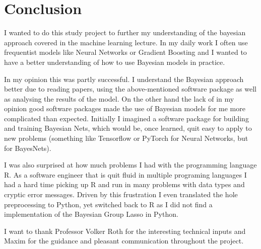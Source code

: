 \documentclass[twoside,twocolumn]{article}
\begin{document}
\section{Conclusion} \label{sec:conclusion}

I wanted to do this study project to further my understanding of the bayesian approach covered in the machine learning lecture.
In my daily work I often use frequentist models like Neural Networks or Gradient Boosting and I wanted to have a better understanding of how to use Bayesian models in practice.

In my opinion this was partly successful.
I understand the Bayesian approach better due to reading papers, using the above-mentioned software package as well as analysing the results of the model.
On the other hand the lack of in my opinion good software packages made the use of Bayesian models for me more complicated than expected.
Initially I imagined a software package for building and training Bayesian Nets, which would be, once learned, quit easy to apply to new problems (something like Tensorflow or PyTorch for Neural Networks, but for BayesNets).

I was also surprised at how much problems I had with the programming language R.
As a software engineer that is quit fluid in multiple programing languages I had a hard time picking up R and run in many problems with data types and cryptic error messages.
Driven by this frustration I even translated the hole preprocessing to Python, yet switched back to R as I did not find a implementation of the Bayesian Group Lasso in Python.

I want to thank Professor Volker Roth for the interesting technical inputs and Maxim for the guidance and pleasant communication throughout the project.

\clearpage

\printbibliography
\end{document}
